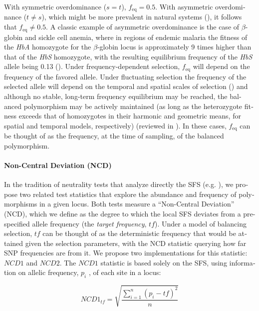\begin{refsection}
\begin{otherlanguage}{english}
With symmetric overdominance ($s=t$), $f_{\mathrm{eq}}=0.5$. With asymmetric overdominance ($t \neq s$), which might be more prevalent in natural systems (\cite{Hedrick2012}), it follows that $f_{\mathrm{eq}} \neq 0.5$. A classic example of asymmetric overdominance is the case of $\beta$-globin and sickle cell anemia, where in regions of endemic malaria the fitness of the \emph{HbA} homozygote for the $\beta$-globin \label{page:HbS} locus is approximately 9 times higher than that of the \emph{HbS} homozygote, with the resulting equilibrium frequency of the \emph{HbS} allele being 0.13 (\cite{Allison1961}). Under frequency-dependent selection, $f_{\mathrm{eq}}$ will depend on the frequency of the favored allele. Under fluctuating selection the frequency of the selected allele will depend on the temporal and spatial scales of selection (\cite{Andres2011,Clarke1964,Pasvol1978}) and although no stable, long-term frequency equilibrium may be reached, the balanced polymorphism may be actively maintained (as long as the heterozygote fitness exceeds that of homozygotes in their harmonic and geometric means, for spatial and temporal models, respectively) (reviewed in \cite{Hedrick2006}). In these cases, $f_{\mathrm{eq}}$ can be thought of as the frequency, at the time of sampling, of the balanced polymorphism. 

\paragraph{Non-Central Deviation (NCD)} In the tradition of neutrality tests that analyze directly the SFS (e.g. \cite{Nielsen2005a,Nielsen2009,Williamson2007}), we propose two related test statistics that explore the abundance and frequency of polymorphisms in a given locus. Both tests measure a \enquote{Non-Central Deviation} (NCD), which we define as the degree to which the local SFS deviates from a pre-specified allele frequency (the \emph{target frequency}, $tf$). Under a model of balancing selection, $tf$ can be thought of as the deterministic frequency that would be attained given the selection parameters, with the NCD statistic querying how far SNP frequencies are from it. We propose two implementations for this statistic: $NCD1$ and $NCD2$. The $NCD1$ statistic is based solely on the SFS, using information on allelic frequency, $p_{i}$ , of each site in a locus:

\begin{equation}
NCD1_{tf}=\sqrt{\frac{\sum\limits_{i=1}^n(p_{i}-tf)^2}{n}}
\end{equation}


\end{otherlanguage}
\end{refsection}
